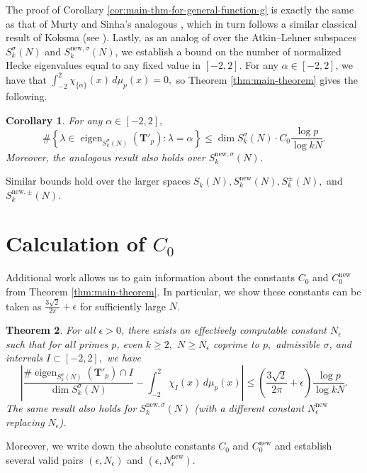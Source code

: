 \documentclass[11pt,letterpaper,reqno]{amsart}
\newtheorem{theorem}{Theorem}[section]
\newtheorem{corollary}[theorem]{Corollary}
\theoremstyle{definition}
\numberwithin{equation}{section}
\numberwithin{figure}{section}
\numberwithin{table}{section}
\newcommand{\lrcb}[1]{\left\{#1\right\}}
\newcommand{\nw}{\mathrm{new}}
\begin{document}
The proof of Corollary \ref{cor:main-thm-for-general-function-g} is exactly the same as that of Murty and Sinha's analogous \cite[Theorem 9]{MS07}, which in turn follows a similar classical result of Koksma (see \cite[Theorem 5.1]{kuipers1974uniform}). Lastly, as an analog of \cite[Theorem 4]{MS07} over the Atkin--Lehner subspaces $S_k^\sigma(N)$ and $S_k^{\nw, \sigma}(N)$, we establish a bound on the number of normalized Hecke eigenvalues equal to any fixed value in $[-2, 2].$ For any $\alpha \in [-2, 2]$, we have that $\int_{-2}^2 \chi_{\{\alpha\}}(x) \, d\mu_p(x) = 0,$ so Theorem \ref{thm:main-theorem} gives the following.


\begin{corollary}\label{cor:main-theorem-with-singleton} 
    For any $\alpha \in [-2, 2],$
    $$\# \lrcb{\lambda \in  \operatorname{eigen}_{S_k^{ \sigma}(N)}(\mathbf{T}'_p) : \lambda = \alpha} \leq \dim S_k^\sigma(N) \cdot C_0 \frac{\log p}{\log kN}.$$
    Moreover, the analogous result also holds over $S_k^{\nw, \sigma}(N)$.
\end{corollary}

Similar bounds hold over the larger spaces $S_k(N), S_k^\nw(N), S_k^\pm(N),$ and $S_k^{\nw, \pm}(N).$

\section{Calculation of \texorpdfstring{$C_0$}{C0}}\label{section:explicit-constants}

Additional work allows us to gain information about the constants $C_0$ and $C_0^\nw$ from Theorem \ref{thm:main-theorem}. In particular, we show these constants can be taken as $\frac{3\sqrt{2}}{2\pi} +\epsilon$ for sufficiently large $N$.
\begin{theorem}\label{thm:limit-constant}
For all $\epsilon > 0$, there exists an effectively computable constant $N_\epsilon$ such that for all primes $p$, even $k \geq 2,$ $N \geq N_\epsilon$ coprime to $p,$ admissible $\sigma$, and intervals $I \subset [-2, 2],$ we have
\[
\left|
\frac{\# \operatorname{eigen}_{S_k^\sigma(N)}(\mathbf{T}'_p) \cap I}{\dim S_k^\sigma(N)}
-
\int_{-2}^2 \chi_I(x) \, d\mu_p(x)
\right|
\leq
\left( \frac{3\sqrt{2}}{2\pi} +\epsilon \right) \frac{\log p}{\log kN}.
\]
The same result also holds for $S_k^{\nw,\sigma}(N)$ (with a different constant $N_\epsilon^\nw$ replacing $N_\epsilon$). 
\end{theorem}
Moreover, we write down the absolute constants $C_0$ and $C_0^\nw$ and establish several valid pairs $(\epsilon, N_\epsilon)$ and $(\epsilon, N_\epsilon^\nw).$
\end{document}
